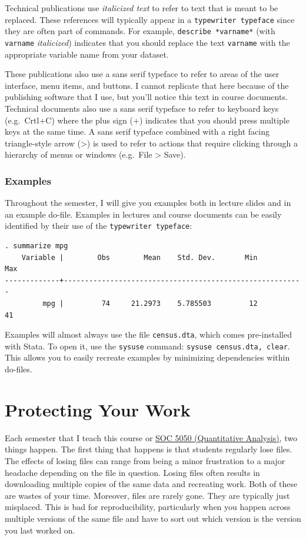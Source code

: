\documentclass[]{book}
\begin{document}
Technical publications use \emph{italicized text} to refer to text that
is meant to be replaced. These references will typically appear in a
\texttt{typewriter\ typeface} since they are often part of commands. For
example, \texttt{describe\ *varname*} (with \texttt{varname}
\emph{italicized}) indicates that you should replace the text
\texttt{varname} with the appropriate variable name from your dataset.

These publications also use a sans serif typeface to refer to areas of
the user interface, menu items, and buttons. I cannot replicate that
here because of the publishing software that I use, but you'll notice
this text in course documents. Technical documents also use a sans serif
typeface to refer to keyboard keys (e.g.~Crtl+C) where the plus sign (+)
indicates that you should press multiple keys at the same time. A sans
serif typeface combined with a right facing triangle-style arrow
(\textgreater{}) is used to refer to actions that require clicking
through a hierarchy of menus or windows (e.g.~File \textgreater{} Save).

\subsection{Examples}\label{examples}

Throughout the semester, I will give you examples both in lecture slides
and in an example do-file. Examples in lectures and course documents can
be easily identified by their use of the \texttt{typewriter\ typeface}:

\begin{verbatim}
. summarize mpg
    Variable |        Obs        Mean    Std. Dev.       Min        Max
-------------+---------------------------------------------------------
         mpg |         74     21.2973    5.785503         12         41
\end{verbatim}

Examples will almost always use the file \texttt{census.dta}, which
comes pre-installed with Stata. To open it, use the \texttt{sysuse}
command: \texttt{sysuse\ census.dta,\ clear}. This allows you to easily
recreate examples by minimizing dependencies within do-files.

\chapter{Protecting Your Work}\label{protecting-your-work}

Each semester that I teach this course or
\href{https://slu-soc5050.github.io}{SOC 5050 (Quantitative Analysis)},
two things happen. The first thing that happens is that students
regularly lose files. The effects of losing files can range from being a
minor frustration to a major headache depending on the file in question.
Losing files often results in downloading multiple copies of the same
data and recreating work. Both of these are wastes of your time.
Moreover, files are rarely gone. They are typically just misplaced. This
is bad for reproducibility, particularly when you happen across multiple
versions of the same file and have to sort out which version is the
version you last worked on.
\end{document}
